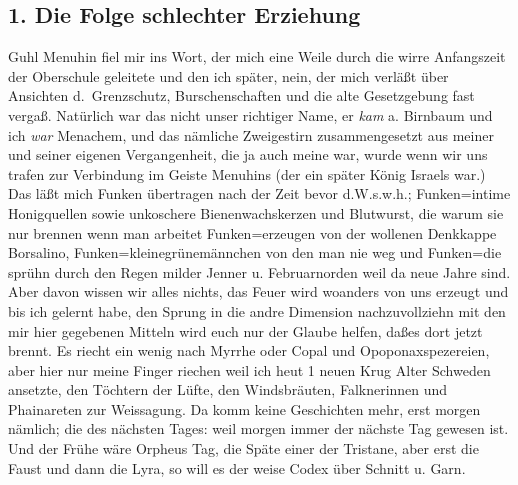 \documentclass[
]{article}
\author{}
\date{\vspace{-2.5em}}
\begin{document}
\subsection{1. Die Folge schlechter
Erziehung}\label{die-folge-schlechter-erziehung}

Guhl Menuhin fiel mir ins Wort, der mich eine Weile durch die wirre
Anfangszeit der Oberschule geleitete und den ich später, nein, der mich
verläßt über Ansichten d.~Grenzschutz, Burschenschaften und die alte
Gesetzgebung fast vergaß. Natürlich war das nicht unser richtiger Name,
er \emph{kam} a. Birnbaum und ich \emph{war} Menachem, und das nämliche
Zweigestirn zusammengesetzt aus meiner und seiner eigenen Vergangenheit,
die ja auch meine war, wurde wenn wir uns trafen zur Verbindung im
Geiste Menuhins (der ein später König Israels war.) Das läßt mich Funken
übertragen nach der Zeit bevor d.W.s.w.h.; Funken=intime Honigquellen
sowie unkoschere Bienenwachskerzen und Blutwurst, die warum sie nur
brennen wenn man arbeitet Funken=erzeugen von der wollenen Denkkappe
Borsalino, Funken=kleinegrünemännchen von den man nie weg und Funken=die
sprühn durch den Regen milder Jenner u. Februarnorden weil da neue Jahre
sind. Aber davon wissen wir alles nichts, das Feuer wird woanders von
uns erzeugt und bis ich gelernt habe, den Sprung in die andre Dimension
nachzuvollziehn mit den mir hier gegebenen Mitteln wird euch nur der
Glaube helfen, daßes dort jetzt brennt. Es riecht ein wenig nach Myrrhe
oder Copal und Opoponaxspezereien, aber hier nur meine Finger riechen
weil ich heut 1 neuen Krug Alter Schweden ansetzte, den Töchtern der
Lüfte, den Windsbräuten, Falknerinnen und Phainareten zur Weissagung. Da
komm keine Geschichten mehr, erst morgen nämlich; die des nächsten
Tages: weil morgen immer der nächste Tag gewesen ist. Und der Frühe wäre
Orpheus Tag, die Späte einer der Tristane, aber erst die Faust und dann
die Lyra, so will es der weise Codex über Schnitt u. Garn.
\end{document}
